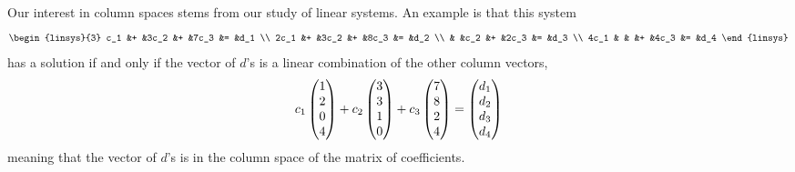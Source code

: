 Our interest in column spaces stems from our study of linear systems.
An example is that this system
\begin{equation*}
  \begin{linsys}{3}
    c_1  &+  &3c_2  &+  &7c_3  &=  &d_1  \\
   2c_1  &+  &3c_2  &+  &8c_3  &=  &d_2  \\
         &   &c_2   &+  &2c_3  &=  &d_3  \\
   4c_1  &   &      &+  &4c_3  &=  &d_4   
  \end{linsys}
\end{equation*}
has a solution if and only if the vector of \( d \)'s is a linear combination
of the other column vectors,
\begin{equation*}
  c_1\begin{pmatrix} 1 \\ 2 \\ 0 \\ 4 \end{pmatrix}
  +c_2\begin{pmatrix} 3 \\ 3 \\ 1 \\ 0 \end{pmatrix}
  +c_3\begin{pmatrix} 7 \\ 8 \\ 2 \\ 4 \end{pmatrix}
  =\begin{pmatrix} d_1 \\ d_2 \\ d_3 \\ d_4 \end{pmatrix}
\end{equation*}
meaning that the vector of \( d \)'s is in the column space of the
matrix of coefficients.

